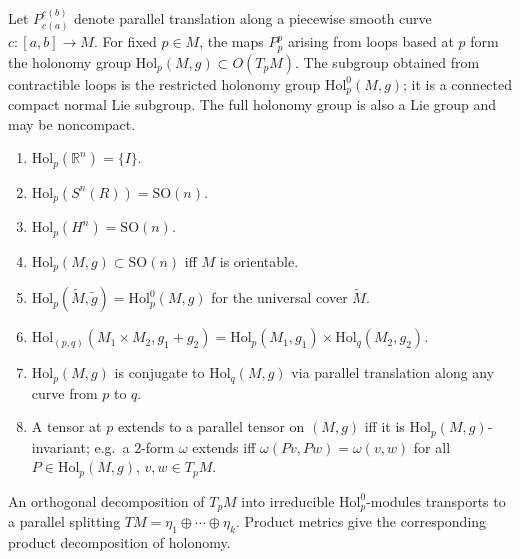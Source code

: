 \begin{definition}
  \label{def:pet-ch10-holonomy-group}

  Let $P_{c(a)}^{c(b)}$ denote parallel translation along a piecewise smooth
  curve $c:[a,b]\to M$. For fixed $p\in M$, the maps $P_p^p$ arising from loops
  based at $p$ form the holonomy group
  $\mathrm{Hol}_p(M,g)\subset O(T_pM)$. The subgroup obtained from contractible
  loops is the restricted holonomy group $\mathrm{Hol}_p^0(M,g)$; it is a
  connected compact normal Lie subgroup. The full holonomy group is also a Lie
  group and may be noncompact.
\end{definition}

\begin{remark}
  \label{rem:pet-ch10-holonomy-properties}

  \begin{enumerate}
    \item[(a)] $\mathrm{Hol}_p(\mathbb R^n)=\{I\}$.
    \item[(b)] $\mathrm{Hol}_p(S^n(R))=\mathrm{SO}(n)$.
    \item[(c)] $\mathrm{Hol}_p(H^n)=\mathrm{SO}(n)$.
    \item[(d)] $\mathrm{Hol}_p(M,g)\subset\mathrm{SO}(n)$ iff $M$ is orientable.
    \item[(e)] $\mathrm{Hol}_p(\widetilde M,\widetilde g)=\mathrm{Hol}_p^0(M,g)$ for the
      universal cover $\widetilde M$.
    \item[(f)] $\mathrm{Hol}_{(p,q)}(M_1\times M_2,g_1+g_2)=\mathrm{Hol}_p(M_1,g_1)\times\mathrm{Hol}_q(M_2,g_2)$.
    \item[(g)] $\mathrm{Hol}_p(M,g)$ is conjugate to $\mathrm{Hol}_q(M,g)$ via parallel
      translation along any curve from $p$ to $q$.
    \item[(h)] A tensor at $p$ extends to a parallel tensor on $(M,g)$ iff it is
      $\mathrm{Hol}_p(M,g)$-invariant; e.g.\ a $2$-form $\omega$ extends iff
      $\omega(Pv,Pw)=\omega(v,w)$ for all $P\in\mathrm{Hol}_p(M,g)$,
      $v,w\in T_pM$.
  \end{enumerate}
\end{remark}

An orthogonal decomposition of $T_pM$ into irreducible
$\mathrm{Hol}_p^0$-modules transports to a parallel splitting
$TM=\eta_1\oplus\cdots\oplus\eta_k$. Product metrics give the corresponding
product decomposition of holonomy.

